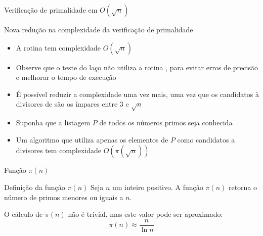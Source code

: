 \begin{frame}[fragile]{Verificação de primalidade em $O(\sqrt{n})$}
\end{frame}

\begin{frame}[fragile]{Nova redução na complexidade da verificação de primalidade}

    \begin{itemize}
        \item A rotina  tem complexidade $O(\sqrt{n})$

        \item Observe que o teste do laço não utiliza a rotina , para evitar 
            erros de precisão e melhorar o tempo de execução

        \item É possível reduzir a complexidade uma vez mais, uma vez que os candidatos à 
            divisores de  são os ímpares entre 3 e $\sqrt{n}$

        \item Suponha que a listagem $P$ de todos os números primos seja conhecida

        \item Um algoritmo que utiliza apenas os elementos de $P$
            como candidatos a divisores tem complexidade $O(\pi(\sqrt{n}))$
    \end{itemize}

\end{frame}


\begin{frame}[fragile]{Função $\pi(n)$}

    \begin{block}{Definição da função $\pi(n)$}
        Seja $n$ um inteiro positivo. A função $\pi(n)$ retorna o número de primos menores
        ou iguais a $n$.
    \end{block}

O cálculo de $\pi(n)$ não é trivial, mas este valor pode ser aproximado:
$$
    \pi(n) \approx \frac{n}{\ln n}
$$

\end{frame}
